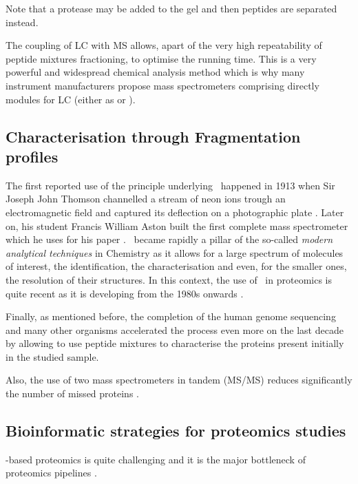 Note that a protease may be added to the gel and then peptides are separated
instead.

The coupling of \gls{LC} with \gls{MS} allows, apart of the very high
repeatability of peptide mixtures fractioning, to optimise the running time.
This is a very powerful and widespread chemical analysis method which is why many instrument manufacturers propose mass
spectrometers comprising directly modules for \gls{LC} (either as
 or ).


\subsection{Characterisation through Fragmentation profiles}

The first reported use of the principle underlying \ms\ happened in 1913 when
Sir Joseph John Thomson channelled a stream of neon ions trough an electromagnetic
field and captured its deflection on a photographic plate .
Later on, his student Francis William Aston built the first complete mass
spectrometer which he uses for his paper 
. \ms\ became rapidly a pillar
of the so-called \emph{modern analytical techniques} in Chemistry as it allows
for a large spectrum of molecules of interest, the identification,
the characterisation and even, for the smaller ones, the resolution of their
structures. In this context, the use of \ms\ in proteomics is quite recent as it
is developing from the 1980s onwards .


Finally, as mentioned before, the completion of the human genome sequencing and
many other organisms accelerated the process even more on the last decade by
allowing to use peptide mixtures to characterise the proteins present initially
in the studied sample.



Also, the use of two mass spectrometers in tandem (\gls{MS/MS}) reduces
significantly the number of missed proteins .


\subsection{Bioinformatic strategies for proteomics studies}

\ms-based proteomics is quite challenging and it is the major bottleneck of
proteomics pipelines .

